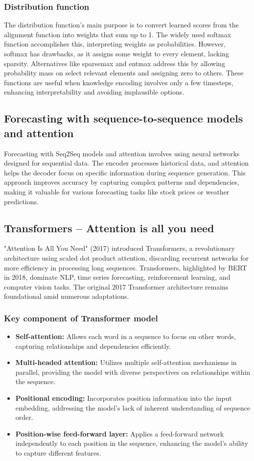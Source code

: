 \documentclass{article}
\begin{document}
\subsubsection{Distribution function}
The distribution function's main purpose is to convert learned scores from the alignment function into weights that sum up to 1. The widely used softmax function accomplishes this, interpreting weights as probabilities. However, softmax has drawbacks, as it assigns some weight to every element, lacking sparsity. Alternatives like sparsemax and entmax address this by allowing probability mass on select relevant elements and assigning zero to others. These functions are useful when knowledge encoding involves only a few timesteps, enhancing interpretability and avoiding implausible options.
\subsection{Forecasting with sequence-to-sequence models and attention}
Forecasting with Seq2Seq models and attention involves using neural networks designed for sequential data. The encoder processes historical data, and attention helps the decoder focus on specific information during sequence generation. This approach improves accuracy by capturing complex patterns and dependencies, making it valuable for various forecasting tasks like stock prices or weather predictions.
\subsection{Transformers – Attention is all you need}
"Attention Is All You Need" (2017) introduced Transformers, a revolutionary architecture using scaled dot product attention, discarding recurrent networks for more efficiency in processing long sequences. Transformers, highlighted by BERT in 2018, dominate NLP, time series forecasting, reinforcement learning, and computer vision tasks. The original 2017 Transformer architecture remains foundational amid numerous adaptations.
\subsubsection{Key component of Transformer model}
\begin{itemize}
    \item \textbf{Self-attention: }Allows each word in a sequence to focus on other words, capturing relationships and dependencies efficiently.
    \item \textbf{Multi-headed attention: }Utilizes multiple self-attention mechanisms in parallel, providing the model with diverse perspectives on relationships within the sequence.
    \item \textbf{Positional encoding: }Incorporates position information into the input embedding, addressing the model's lack of inherent understanding of sequence order.
    \item \textbf{Position-wise feed-forward layer: }Applies a feed-forward network independently to each position in the sequence, enhancing the model's ability to capture different features.
\end{itemize}
\end{document}
